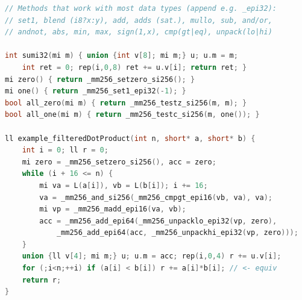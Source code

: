 \begin{multicols}{\Columns}
\begin{lstlisting}[language=C++]
// Methods that work with most data types (append e.g. _epi32):
// set1, blend (i8?x:y), add, adds (sat.), mullo, sub, and/or,
// andnot, abs, min, max, sign(1,x), cmp(gt|eq), unpack(lo|hi)

int sumi32(mi m) { union {int v[8]; mi m;} u; u.m = m;
	int ret = 0; rep(i,0,8) ret += u.v[i]; return ret; }
mi zero() { return _mm256_setzero_si256(); }
mi one() { return _mm256_set1_epi32(-1); }
bool all_zero(mi m) { return _mm256_testz_si256(m, m); }
bool all_one(mi m) { return _mm256_testc_si256(m, one()); }

ll example_filteredDotProduct(int n, short* a, short* b) {
	int i = 0; ll r = 0;
	mi zero = _mm256_setzero_si256(), acc = zero;
	while (i + 16 <= n) {
		mi va = L(a[i]), vb = L(b[i]); i += 16;
		va = _mm256_and_si256(_mm256_cmpgt_epi16(vb, va), va);
		mi vp = _mm256_madd_epi16(va, vb);
		acc = _mm256_add_epi64(_mm256_unpacklo_epi32(vp, zero),
			_mm256_add_epi64(acc, _mm256_unpackhi_epi32(vp, zero)));
	}
	union {ll v[4]; mi m;} u; u.m = acc; rep(i,0,4) r += u.v[i];
	for (;i<n;++i) if (a[i] < b[i]) r += a[i]*b[i]; // <- equiv
	return r;
}
\end{lstlisting}






\end{multicols}

